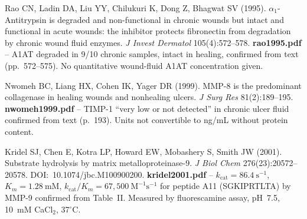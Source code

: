 \documentclass[10pt,a4paper]{article}
\numberwithin{equation}{section}
\newcommand{\Mms}{\text{M}^{-1}\text{s}^{-1}}
\begin{document}
\begin{enumerate}[label={[\arabic*]},noitemsep,leftmargin=*]
\item Rao CN, Ladin DA, Liu YY, Chilukuri K, Dong Z, Bhagwat SV (1995).
  $\alpha_1$-Antitrypsin is degraded and non-functional in chronic wounds but intact
  and functional in acute wounds: the inhibitor protects fibronectin from degradation
  by chronic wound fluid enzymes. \textit{J Invest Dermatol} 105(4):572--578.
  \textbf{rao1995.pdf} -- A1AT degraded in 9/10 chronic samples, intact in healing,
  confirmed from text (pp.~572--575). No quantitative wound-fluid A1AT concentration given.

\item Nwomeh BC, Liang HX, Cohen IK, Yager DR (1999). MMP-8 is the predominant
  collagenase in healing wounds and nonhealing ulcers.
  \textit{J Surg Res} 81(2):189--195.
  \textbf{nwomeh1999.pdf} -- TIMP-1 ``very low or not detected'' in chronic ulcer fluid
  confirmed from text (p.~193). Units not convertible to ng/mL without protein content.

\item Kridel SJ, Chen E, Kotra LP, Howard EW, Mobashery S, Smith JW (2001). Substrate
  hydrolysis by matrix metalloproteinase-9.
  \textit{J Biol Chem} 276(23):20572--20578. DOI:~10.1074/jbc.M100900200.
  \textbf{kridel2001.pdf} -- $k_{\text{cat}} = 86.4\ \text{s}^{-1}$,
  $K_m = 1.28\ \text{mM}$, $k_{\text{cat}}/K_m = 67{,}500\ \Mms$ for peptide A11
  (SGKIPRTLTA) by MMP-9 confirmed from Table~II. Measured by fluorescamine assay,
  pH~7.5, 10~mM CaCl$_2$, 37$^\circ$C.

\end{enumerate}
\end{document}

